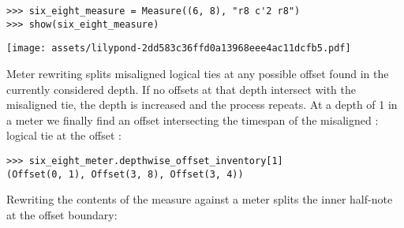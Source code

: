 \begin{comment}
<abjad>
six_eight_measure = Measure((6, 8), "r8 c'2 r8")
show(six_eight_measure)
</abjad>
\end{comment}

\begin{abjadbookoutput}
\begin{singlespacing}
\vspace{-0.5\baselineskip}
\begin{verbatim}
>>> six_eight_measure = Measure((6, 8), "r8 c'2 r8")
>>> show(six_eight_measure)
\end{verbatim}
\noindent\texttt{[image: assets/lilypond-2dd583c36ffd0a13968eee4ac11dcfb5.pdf]}
\end{singlespacing}
\end{abjadbookoutput}

\noindent Meter rewriting splits misaligned logical ties at any possible offset
found in the currently considered depth. If no offsets at that depth intersect
with the misaligned tie, the depth is increased and the process repeats. At a
depth of 1 in a  meter we finally find an offset intersecting the
timespan of the misaligned : logical tie at the offset
:

\begin{comment}
<abjad>
six_eight_meter.depthwise_offset_inventory[1]
</abjad>
\end{comment}

\begin{abjadbookoutput}
\begin{singlespacing}
\vspace{-0.5\baselineskip}
\begin{verbatim}
>>> six_eight_meter.depthwise_offset_inventory[1]
(Offset(0, 1), Offset(3, 8), Offset(3, 4))
\end{verbatim}
\end{singlespacing}
\end{abjadbookoutput}

\noindent Rewriting the contents of the  measure against a
 meter splits the inner half-note at the  offset
boundary:

\begin{comment}
<abjad>
mutate(six_eight_measure).rewrite_meter(six_eight_meter)
show(six_eight_measure)
</abjad>
\end{comment}

